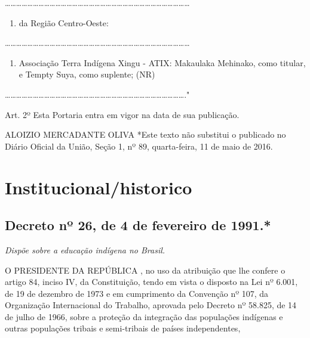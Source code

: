 \documentclass[
]{book}
\providecommand{\tightlist}{%
  \setlength{\itemsep}{0pt}\setlength{\parskip}{0pt}}
\begin{document}
\ldots\ldots\ldots\ldots\ldots\ldots\ldots\ldots\ldots\ldots\ldots\ldots\ldots\ldots\ldots\ldots\ldots\ldots\ldots\ldots\ldots\ldots\ldots\ldots\ldots\ldots\ldots\ldots\ldots\ldots\ldots\ldots\ldots{}

\begin{enumerate}
\def\labelenumi{\alph{enumi})}
\setcounter{enumi}{2}
\tightlist
\item
  da Região Centro-Oeste:
\end{enumerate}

\ldots\ldots\ldots\ldots\ldots\ldots\ldots\ldots\ldots\ldots\ldots\ldots\ldots\ldots\ldots\ldots\ldots\ldots\ldots\ldots\ldots\ldots\ldots\ldots\ldots\ldots\ldots\ldots\ldots\ldots\ldots\ldots\ldots{}

\begin{enumerate}
\def\labelenumi{\arabic{enumi}.}
\setcounter{enumi}{1}
\tightlist
\item
  Associação Terra Indígena Xingu - ATIX: Makaulaka Mehinako, como titular, e Tempty Suya, como suplente; (NR)
\end{enumerate}

\ldots\ldots\ldots\ldots\ldots\ldots\ldots\ldots\ldots\ldots\ldots\ldots\ldots\ldots\ldots\ldots\ldots\ldots\ldots\ldots\ldots\ldots\ldots\ldots\ldots\ldots\ldots\ldots\ldots\ldots\ldots\ldots."

Art. 2º Esta Portaria entra em vigor na data de sua publicação.

ALOIZIO MERCADANTE OLIVA
*Este texto não substitui o publicado no Diário Oficial da União, Seção 1, nº 89, quarta-feira, 11 de maio de 2016.

\hypertarget{institucionalhistorico}{%
\chapter{Institucional/historico}\label{institucionalhistorico}}

\hypertarget{decreto-nuxba-26-de-4-de-fevereiro-de-1991.}{%
\section{Decreto nº 26, de 4 de fevereiro de 1991.*}\label{decreto-nuxba-26-de-4-de-fevereiro-de-1991.}}

\emph{Dispõe sobre a educação indígena no Brasil.}

O PRESIDENTE DA REPÚBLICA , no uso da atribuição que lhe confere o artigo 84, inciso IV, da Constituição, tendo em vista o disposto na Lei nº 6.001, de 19 de dezembro de 1973 e em cumprimento da Convenção nº 107, da Organização Internacional do Trabalho, aprovada pelo Decreto nº 58.825, de 14 de julho de 1966, sobre a proteção da integração das populações indígenas e outras populações tribais e semi-tribais de países independentes,
\end{document}
